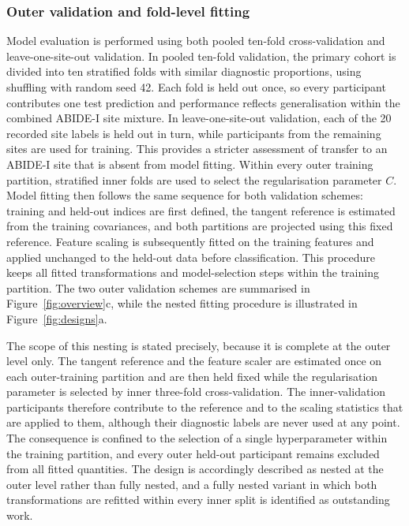 \subsubsection{Outer validation and fold-level fitting}
\label{subsubsec:outer-validation}
Model evaluation is performed using both pooled ten-fold cross-validation and leave-one-site-out validation. In pooled ten-fold validation, the primary cohort is divided into ten stratified folds with similar diagnostic proportions, using shuffling with random seed 42. Each fold is held out once, so every participant contributes one test prediction and performance reflects generalisation within the combined ABIDE-I site mixture. In leave-one-site-out validation, each of the 20 recorded site labels is held out in turn, while participants from the remaining sites are used for training. This provides a stricter assessment of transfer to an ABIDE-I site that is absent from model fitting. Within every outer training partition, stratified inner folds are used to select the regularisation parameter $C$. Model fitting then follows the same sequence for both validation schemes: training and held-out indices are first defined, the tangent reference is estimated from the training covariances, and both partitions are projected using this fixed reference. Feature scaling is subsequently fitted on the training features and applied unchanged to the held-out data before classification. This procedure keeps all fitted transformations and model-selection steps within the training partition. The two outer validation schemes are summarised in Figure~\ref{fig:overview}c, while the nested fitting procedure is illustrated in Figure~\ref{fig:designs}a.

The scope of this nesting is stated precisely, because it is complete at the outer level only.
The tangent reference and the feature scaler are estimated once on each outer-training
partition and are then held fixed while the regularisation parameter is selected by inner
three-fold cross-validation. The inner-validation participants therefore contribute to the
reference and to the scaling statistics that are applied to them, although their diagnostic
labels are never used at any point. The consequence is confined to the selection of a single
hyperparameter within the training partition, and every outer held-out participant remains
excluded from all fitted quantities. The design is accordingly described as nested at the
outer level rather than fully nested, and a fully nested variant in which both transformations
are refitted within every inner split is identified as outstanding work.

